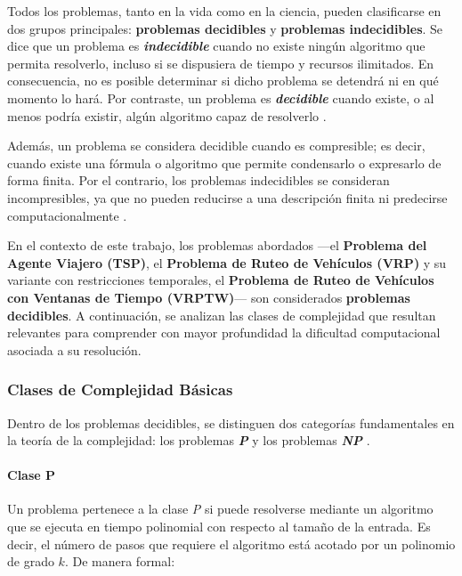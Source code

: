 \documentclass[12pt,titlepage,twoside,openright]{book}
\begin{document}
Todos los problemas, tanto en la vida como en la ciencia, pueden clasificarse en dos grupos principales: \textbf{problemas decidibles} y \textbf{problemas indecidibles}. Se dice que un problema es \textbf{\emph{indecidible}} cuando no existe ningún algoritmo que permita resolverlo, incluso si se dispusiera de tiempo y recursos ilimitados. En consecuencia, no es posible determinar si dicho problema se detendrá ni en qué momento lo hará. Por contraste, un problema es \textbf{\emph{decidible}} cuando existe, o al menos podría existir, algún algoritmo capaz de resolverlo \citep{maldonado2013problema}.

Además, un problema se considera decidible cuando es compresible; es decir, cuando existe una fórmula o algoritmo que permite condensarlo o expresarlo de forma finita. Por el contrario, los problemas indecidibles se consideran incompresibles, ya que no pueden reducirse a una descripción finita ni predecirse computacionalmente \citep{maldonado2013problema}.

En el contexto de este trabajo, los problemas abordados —el \textbf{Problema del Agente Viajero (TSP)}, el \textbf{Problema de Ruteo de Vehículos (VRP)} y su variante con restricciones temporales, el \textbf{Problema de Ruteo de Vehículos con Ventanas de Tiempo (VRPTW)}— son considerados \textbf{problemas decidibles}. A continuación, se analizan las clases de complejidad que resultan relevantes para comprender con mayor profundidad la dificultad computacional asociada a su resolución.

\subsubsection{Clases de Complejidad Básicas}

Dentro de los problemas decidibles, se distinguen dos categorías fundamentales en la teoría de la complejidad: los problemas \textbf{\emph{P}} y los problemas \textbf{\emph{NP}} \citep{maldonado2013problema}.

\paragraph{Clase P}

Un problema pertenece a la clase \emph{P} si puede resolverse mediante un algoritmo que se ejecuta en tiempo polinomial con respecto al tamaño de la entrada. Es decir, el número de pasos que requiere el algoritmo está acotado por un polinomio de grado \(k\). De manera formal:
\end{document}
